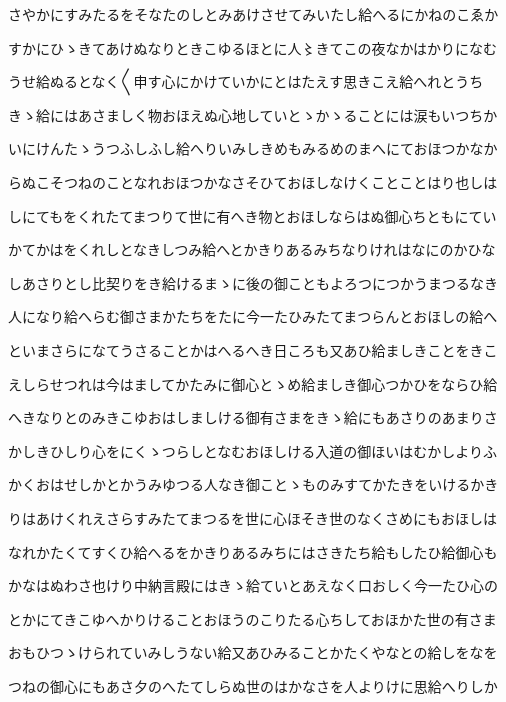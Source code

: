 \documentclass[a4paper,11pt,landscape]{ltjtarticle}
\begin{document}
さやかにすみたるをそなたのしとみあけさせてみいたし給へるにかねのこゑか
\par\medskip
すかにひゝきてあけぬなりときこゆるほとに人〻きてこの夜なかはかりになむ
\par\medskip
うせ給ぬるとなく〱申す心にかけていかにとはたえす思きこえ給へれとうち
\par\medskip
きゝ給にはあさましく物おほえぬ心地していとゝかゝることには涙もいつちか
\par\medskip
いにけんたゝうつふしふし給へりいみしきめもみるめのまへにておほつかなか
\par\medskip
らぬこそつねのことなれおほつかなさそひておほしなけくことことはり也しは
\par\medskip
しにてもをくれたてまつりて世に有へき物とおほしならはぬ御心ちともにてい
\par\medskip
かてかはをくれしとなきしつみ給へとかきりあるみちなりけれはなにのかひな
\par\medskip
しあさりとし比契りをき給けるまゝに後の御こともよろつにつかうまつるなき
\par\medskip
人になり給へらむ御さまかたちをたに今一たひみたてまつらんとおほしの給へ
\par\medskip
といまさらになてうさることかはへるへき日ころも又あひ給ましきことをきこ
\par\medskip
えしらせつれは今はましてかたみに御心とゝめ給ましき御心つかひをならひ給
\par\medskip
へきなりとのみきこゆおはしましける御有さまをきゝ給にもあさりのあまりさ
\par\medskip
かしきひしり心をにくゝつらしとなむおほしける入道の御ほいはむかしよりふ
\par\medskip
かくおはせしかとかうみゆつる人なき御ことゝものみすてかたきをいけるかき
\par\medskip
りはあけくれえさらすみたてまつるを世に心ほそき世のなくさめにもおほしは
\par\medskip
なれかたくてすくひ給へるをかきりあるみちにはさきたち給もしたひ給御心も
\par\medskip
かなはぬわさ也けり中納言殿にはきゝ給ていとあえなく口おしく今一たひ心の
\par\medskip
とかにてきこゆへかりけることおほうのこりたる心ちしておほかた世の有さま
\par\medskip
おもひつゝけられていみしうない給又あひみることかたくやなとの給しをなを
\par\medskip
つねの御心にもあさ夕のへたてしらぬ世のはかなさを人よりけに思給へりしか
\par\medskip
\end{document}

